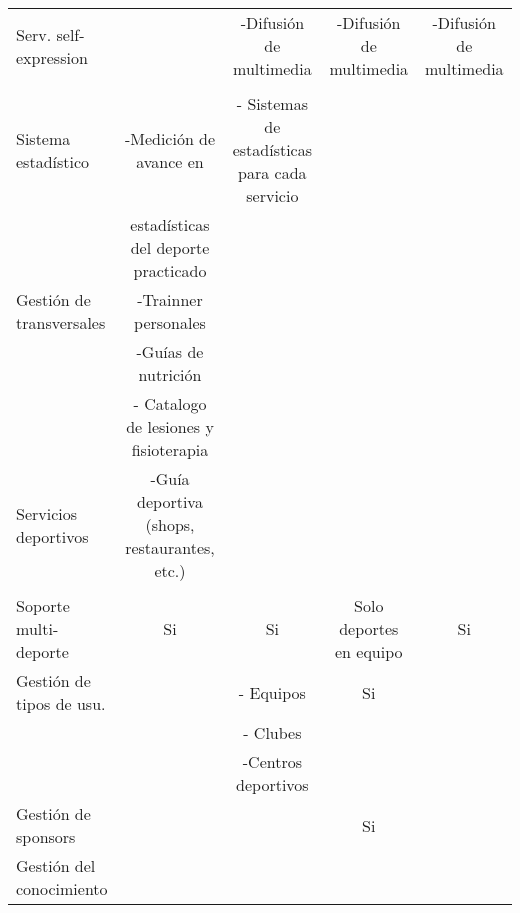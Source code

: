 \begin{landscape}
\begin{table}
\begin{center}
{\begin{tabular}{|p{5cm}|llll|}
    \hline
    Serv. self-expression & \multicolumn{1}{c}{} & \multicolumn{1}{c}{-Difusión de multimedia} & \multicolumn{1}{c}{-Difusión de multimedia } & \multicolumn{1}{c|}{-Difusión de multimedia} \\ 
     & \multicolumn{1}{c}{} & \multicolumn{1}{c}{} & \multicolumn{1}{c}{} & \multicolumn{1}{c|}{} \\ 
    \hline
    Sistema estadístico & \multicolumn{1}{c}{-Medición de avance en} & \multicolumn{1}{c}{- Sistemas de estadísticas para cada servicio} & \multicolumn{1}{c}{} & \multicolumn{1}{c|}{} \\ 
     & \multicolumn{1}{c}{ estadísticas del deporte practicado} & \multicolumn{1}{c}{} & \multicolumn{1}{c}{} & \multicolumn{1}{c|}{} \\ 
    \hline
    Gestión de transversales & \multicolumn{1}{c}{-Trainner personales} & \multicolumn{1}{c}{} & \multicolumn{1}{c}{} & \multicolumn{1}{c|}{} \\ 
     & \multicolumn{1}{c}{-Guías de nutrición} & \multicolumn{1}{c}{} & \multicolumn{1}{c}{} & \multicolumn{1}{c|}{} \\ 
     & \multicolumn{1}{c}{- Catalogo de lesiones y fisioterapia} & \multicolumn{1}{c}{} & \multicolumn{1}{c}{} & \multicolumn{1}{c|}{} \\ 
    \hline
    Servicios deportivos & \multicolumn{1}{c}{-Guía deportiva (shops, restaurantes, etc.)} & \multicolumn{1}{c}{} & \multicolumn{1}{c}{} & \multicolumn{1}{c|}{} \\ 
     & \multicolumn{1}{c}{} & \multicolumn{1}{c}{} & \multicolumn{1}{c}{} & \multicolumn{1}{c|}{} \\ 
    \hline
    Soporte multi-deporte & \multicolumn{1}{c}{Si} & \multicolumn{1}{c}{Si} & \multicolumn{1}{c}{Solo deportes en equipo} & \multicolumn{1}{c|}{Si} \\ 
    \hline
    Gestión de tipos de usu. & \multicolumn{1}{c}{} & \multicolumn{1}{c}{- Equipos } & \multicolumn{1}{c}{Si} & \multicolumn{1}{c|}{} \\ 
     & \multicolumn{1}{c}{} & \multicolumn{1}{c}{- Clubes} & \multicolumn{1}{c}{} & \multicolumn{1}{c|}{} \\ 
     & \multicolumn{1}{c}{} & \multicolumn{1}{c}{-Centros deportivos} & \multicolumn{1}{c}{} & \multicolumn{1}{c|}{} \\ 
    \hline
    Gestión de sponsors & \multicolumn{1}{c}{} & \multicolumn{1}{c}{} & \multicolumn{1}{c}{Si} & \multicolumn{1}{c|}{} \\ 
    \hline
    Gestión del conocimiento & \multicolumn{1}{c}{} & \multicolumn{1}{c}{} & \multicolumn{1}{c}{} & \multicolumn{1}{c|}{} \\ 

\end{tabular}}
\end{center}
\end{table}
\end{landscape}
